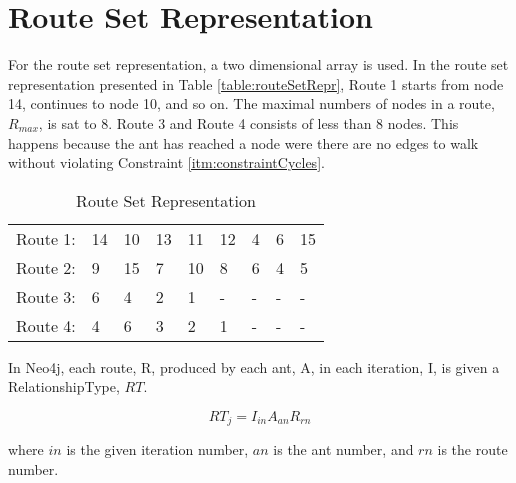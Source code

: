 \section{Route Set Representation}
For the route set representation, a two dimensional array is used. In the route set representation presented in Table \vref{table:routeSetRepr}, Route 1 starts from node 14, continues to node 10, and so on. The maximal numbers of nodes in a route, $R_{max}$, is sat to 8. Route 3 and Route 4 consists of less than 8 nodes. This happens because the ant has reached a node were there are no edges to walk without violating Constraint \vref{itm:constraintCycles}.
\begin{table}[H]
    \begin{center}
        \begin{tabular}{|l| l l l l l l l l|}
      \hline
        Route 1: & 14 & 10 & 13 & 11 & 12 & 4 & 6 & 15 \\
        Route 2: & 9 & 15 & 7 & 10 & 8 & 6 & 4 & 5 \\
        Route 3: & 6 & 4 & 2 & 1 & - & - & - & - \\
        Route 4: & 4 & 6 & 3 & 2 & 1 & - & - & - \\
      \hline
        \end{tabular}
    \end{center}
    \caption {Route Set Representation}
    \label{table:routeSetRepr}
\end{table}

In Neo4j, each route, R, produced by each ant, A, in each iteration, I, is given a RelationshipType, $RT$.

$$RT_j = I_{in}A_{an}R_{rn}$$

where $in$ is the given iteration number, $an$ is the ant number, and $rn$ is the route number.
